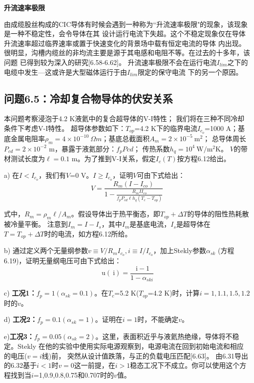 \textbf{升流速率极限}

由成缆股丝构成的CIC导体有时候会遇到一种称为``升流速率极限"的现象，该现象是一种不稳定性，会令导体在其
设计运行电流下失超。这个不稳定现象仅在导体升流速率超过临界速率或置于快速变化的背景场中载有恒定电流的导体
内出现。很明显，沟槽内缆丝的非均流主要是源于其电感和电阻不等。在过去的十多年，该问题
已得到较为深入的研究[6.58-6.62]。
升流速率极限不会在运行电流$I_{lim}$之下的电缆中发生---这或许是大型磁体运行于由$I_{lim}$限定的保守电流
下的另一个原因。

\subsection{问题6.5：冷却复合物导体的伏安关系}
本问题考察浸泡于4.2 K液氦中的复合超导体的V-I特性；
我们将在三种不同冷却条件下考虑V-I特性。
超导体参数如下：$T_{op}$=4.2 K下的临界电流$I_{c_o}$=1000 A；基底金属电阻率$\rho_m=4\times 10^{-10}\ 
\Omega m$；基底总截面积$A_m=2\times 10^{-5}\ \mathrm{m^2}$；
总导体周长$P_{cd}=2\times 10^{-2}$ m，暴露于液氦部分：$f_p P{cd}$；
传热系数$h_q=10^4\ \mathrm{W/m^2K}$。
$V$的带材测试长度为$\ell=0.1$ m。为了推到V-I关系，假定$I_c(T)$按方程6.12给出。

a) 在$I<I_{c_o}$，我们有$V$=0 V。$I\ge I_{c_o}$，证明$V$可由下式给出：
\begin{equation}%
V=\frac{R_m(I-I_{co})}{1-\frac{R_mII_{co}}{f_pP_{cd}\ell h_q(T_c-T_{op})}}
\end{equation}

式中，$R_m=\rho_m \ell/A_m$。假设导体出于热平衡态，即$T_{op}+\Delta T$的导体的阻性热耗散被冷量平衡。
注意到$I_m=I-I_s$，其中$I_m$是基底电流，$I_s$是超导体在$T=T_{op}+\Delta T$时的电流，如方程6.12所给。

b) 通过定义两个无量纲参数$v\equiv V/R_m I_{c_o}, i\equiv I/I_{c_o}$，加上Stekly参数$\alpha_{sk}$
(方程6.19)，证明无量纲电压可由下式给出：
\begin{equation}%
\ \mathrm{u}(\ \mathrm{i})=\frac{\ \mathrm{i}-1}{1-\alpha_{ski}}
\end{equation}

c) \textbf{工况1：}$f_p=1(\alpha_{sk}=0.1)$。在$T_c$=5.2 K($T_{op}$=4.2 K)时，计算$i=1,1.1,1.5,1.2$
时的$v$。

d) \textbf{工况2：}$f_p=0.1(\alpha_{sk}=1)$。证明在$i=1$时，不能确定$v$。

e)\textbf{工况3：}$f_p=0.05(\alpha_{sk}=2)$。这里，表面积近乎与液氦热绝缘，导体将不稳定。Stekly
在他的实验中使用实际电源观察到，电源电流在回到初始电流和相应的电压($v=i$线)前，
突然从设计值跌落，与正的负载电压匹配[6.63]。
由6.31导出的6.32基于$i<1$时$v=0$这一前提，在$i>1$稳态工况下不成立。你可以使用这个方程找到当$i$=1,0.9,0.8,0.75和0.707时的$v$值。

